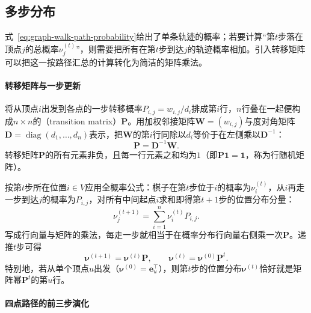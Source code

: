 \subsection{多步分布}
\label{sec:graph-walk-distributions}

式~\eqref{eq:graph-walk-path-probability}给出了单条轨迹的概率；若要计算“第$t$步落在顶点$j$的总概率$\nu_j^{(t)}$”，则需要把所有在第$t$步到达$j$的轨迹概率相加。引入转移矩阵可以把这一按路径汇总的计算转化为简洁的矩阵乘法。

\paragraph{转移矩阵与一步更新}

将从顶点$i$出发到各点的一步转移概率$P_{i,j}=w_{i,j}/d_i$排成第$i$行，$n$行叠在一起便构成$n\times n$的（transition matrix）$\bm{P}$。用加权邻接矩阵$\bm W=(w_{i,j})$与度对角矩阵$\bm D=\operatorname{diag}(d_1,\ldots,d_n)$表示，把$\bm W$的第$i$行同除以$d_i$等价于在左侧乘以$\bm D^{-1}$：
\begin{equation}
\bm{P}=\bm{D}^{-1}\bm{W}.
\label{eq:graph-walk-transition-matrix}
\end{equation}
转移矩阵$\bm P$的所有元素非负，且每一行元素之和均为$1$（即$\bm{P}\bm{1}=\bm{1}$，称为行随机矩阵）。

按第$t$步所在位置$i\in V$应用全概率公式：棋子在第$t$步位于$i$的概率为$\nu_i^{(t)}$，从$i$再走一步到达$j$的概率为$P_{i,j}$，对所有中间起点$i$求和即得第$t+1$步的位置分布分量：
\begin{equation}
\nu^{(t+1)}_j=\sum_{i=1}^n \nu^{(t)}_i P_{i,j}.
\label{eq:graph-walk-distribution-entry}
\end{equation}
写成行向量与矩阵的乘法，每走一步就相当于在概率分布行向量右侧乘一次$\bm P$。递推$t$步可得
\begin{equation}
\bm{\nu}^{(t+1)}=\bm{\nu}^{(t)}\bm{P},
\qquad
\bm{\nu}^{(t)}=\bm{\nu}^{(0)}\bm{P}^t.
\label{eq:graph-walk-distribution}
\end{equation}
特别地，若从单个顶点$u$出发（$\bm\nu^{(0)}=\bm e_u^\top$），则第$t$步的位置分布$\bm\nu^{(t)}$恰好就是矩阵幂$\bm P^t$的第$u$行。

\paragraph{四点路径的前三步演化}

